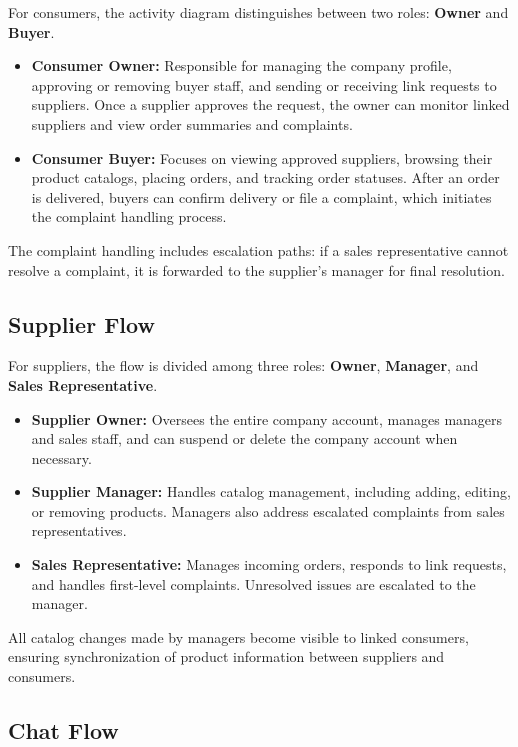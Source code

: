 For consumers, the activity diagram distinguishes between two roles: \textbf{Owner} and \textbf{Buyer}.

\begin{itemize}
    \item \textbf{Consumer Owner:} Responsible for managing the company profile, approving or removing buyer staff, and sending or receiving link requests to suppliers. Once a supplier approves the request, the owner can monitor linked suppliers and view order summaries and complaints.
    \item \textbf{Consumer Buyer:} Focuses on viewing approved suppliers, browsing their product catalogs, placing orders, and tracking order statuses. After an order is delivered, buyers can confirm delivery or file a complaint, which initiates the complaint handling process.
\end{itemize}

The complaint handling includes escalation paths: if a sales representative cannot resolve a complaint, it is forwarded to the supplier’s manager for final resolution.

\subsection{Supplier Flow}

For suppliers, the flow is divided among three roles: \textbf{Owner}, \textbf{Manager}, and \textbf{Sales Representative}.

\begin{itemize}
    \item \textbf{Supplier Owner:} Oversees the entire company account, manages managers and sales staff, and can suspend or delete the company account when necessary.
    \item \textbf{Supplier Manager:} Handles catalog management, including adding, editing, or removing products. Managers also address escalated complaints from sales representatives.
    \item \textbf{Sales Representative:} Manages incoming orders, responds to link requests, and handles first-level complaints. Unresolved issues are escalated to the manager.
\end{itemize}

All catalog changes made by managers become visible to linked consumers, ensuring synchronization of product information between suppliers and consumers.

\subsection{Chat Flow}

